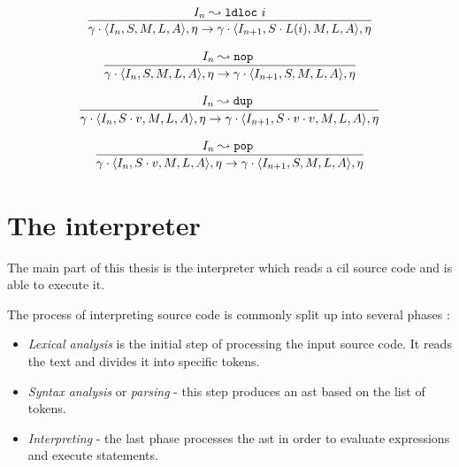\documentclass{article}
\numberwithin{equation}{section}
\newcommand{\mstate}[5] {
	\langle#1, #2, #3, #4, #5\rangle
}
\newcommand{\ipointsto}[3] {
	#1 \leadsto \texttt{#2} \text{ } #3
}
\begin{document}
\begin{equation}
\label{eq:semantics_ldloc}
	\infer{
		\gamma \cdot \mstate{I_n}{S}{M}{L}{A}, \eta
			\rightarrow
		\gamma \cdot \mstate{I_{n+1}}{S \cdot L(i)}{M}{L}{A}, \eta
	}
	{\ipointsto{I_n}{ldloc}{i}}
\end{equation}

\begin{equation}
\label{eq:semantics_nop}
	\infer{
		\gamma \cdot \mstate{I_n}{S}{M}{L}{A}, \eta
			\rightarrow
		\gamma \cdot \mstate{I_{n+1}}{S}{M}{L}{A}, \eta
	}
	{\ipointsto{I_n}{nop}}
\end{equation}

\begin{equation}
\label{eq:semantics_dup}
	\infer{
		\gamma \cdot \mstate{I_n}{S \cdot v}{M}{L}{A}, \eta
			\rightarrow
		\gamma \cdot \mstate{I_{n+1}}{S \cdot v \cdot v}{M}{L}{A}, \eta
	}
	{\ipointsto{I_n}{dup}}
\end{equation}

\begin{equation}
\label{eq:semantics_pop}
	\infer{
		\gamma \cdot \mstate{I_n}{S \cdot v}{M}{L}{A}, \eta
			\rightarrow
		\gamma \cdot \mstate{I_{n+1}}{S}{M}{L}{A}, \eta
	}
	{\ipointsto{I_n}{pop}}
\end{equation}

\clearpage


\section{The interpreter}
\label{sec:interpreter}

The main part of this thesis is the interpreter which reads a \acrshort{cil} source code and is able to execute it.

The process of interpreting source code is commonly split up into several phases \cite{compilerDesign}:
\begin{itemize}
	\item{\textit{Lexical analysis} is the initial step of processing the input source code. It reads the text and divides it into specific tokens.}
	\item{\textit{Syntax analysis} or \textit{parsing} - this step produces an \acrshort{ast} based on the list of tokens.}
	\item{\textit{Interpreting} - the last phase processes the \acrshort{ast} in order to evaluate expressions and execute statements.}
\end{itemize}
\end{document}
